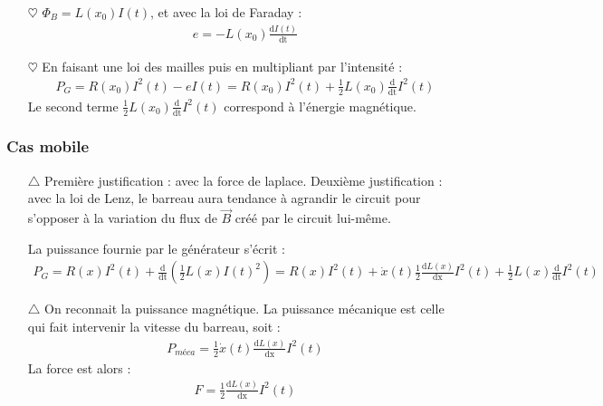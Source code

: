 \documentclass{report}
\begin{document}
\begin{itemize}

	\item[$\heartsuit$] $\Phi_B=L(x_0)I(t)$, et avec la loi de Faraday :
	\begin{align*}
		e=-L(x_0)\frac{\mathrm{d}I(t)}{\mathrm{dt}}
	\end{align*}
	
	\item[$\heartsuit$] En faisant une loi des mailles puis en multipliant par l'intensité :
	\begin{align*}
		P_G=R(x_0)I^2(t)-eI(t)=R(x_0)I^2(t)+\frac{1}{2}L(x_0)\frac{\mathrm{d}} {\mathrm{dt}}I^2(t)
	\end{align*}
	Le second terme $\frac{1}{2}L(x_0)\frac{\mathrm{d}} {\mathrm{dt}}I^2(t)$ correspond à l'énergie magnétique.

\end{itemize}

\subsubsection*{Cas mobile}

\begin{itemize}

	\item[$\triangle$] Première justification : avec la force de laplace. Deuxième justification : avec la loi de Lenz, le barreau aura tendance à agrandir le circuit pour s'opposer à la variation du flux de $\vec{B}$ créé par le circuit lui-même.
	
	La puissance fournie par le générateur s'écrit :
	\begin{align*}
		P_G=R(x)I^2(t)+\frac{\mathrm{d}} {\mathrm{dt}}\left(\frac{1}{2}L(x)I(t)^2\right) = R(x)I^2(t) + \dot{x}(t)\frac{1}{2}\frac{\mathrm{d}L(x)}{\mathrm{dx}}I^2(t)+\frac{1}{2}L(x)\frac{\mathrm{d}} {\mathrm{dt}}I^2(t)
	\end{align*}
	
	\item[$\triangle$] On reconnait la puissance magnétique. La puissance mécanique est celle qui fait intervenir la vitesse du barreau, soit :
	\begin{align*}
		P_{méca}=\frac{1}{2}\dot{x}(t)\frac{\mathrm{d}L(x)}{\mathrm{dx}}I^2(t)
	\end{align*}	
La force est alors :
	\begin{align*}
		F=\frac{1}{2}\frac{\mathrm{d}L(x)}{\mathrm{dx}}I^2(t)
	\end{align*}	

\end{itemize}
\end{document}
